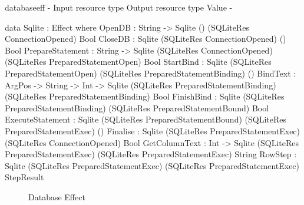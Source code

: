 \begin{SaveVerbatim}{databaseeff}
{-                   { Input resource type }                     { Output resource type }             { Value } -}

data Sqlite : Effect where
  OpenDB           : String -> 
                     Sqlite ()                                   (SQLiteRes ConnectionOpened)         Bool
  CloseDB          : Sqlite (SQLiteRes ConnectionOpened)         ()                                   Bool
  PrepareStatement : String -> 
                     Sqlite (SQLiteRes ConnectionOpened)         (SQLiteRes PreparedStatementOpen)    Bool
  StartBind        : Sqlite (SQLiteRes PreparedStatementOpen)    (SQLiteRes PreparedStatementBinding) ()
  BindText         : ArgPos -> String -> Int -> 
                     Sqlite (SQLiteRes PreparedStatementBinding) (SQLiteRes PreparedStatementBinding) Bool
  FinishBind       : Sqlite (SQLiteRes PreparedStatementBinding) (SQLiteRes PreparedStatementBound)   Bool
  ExecuteStatement : Sqlite (SQLiteRes PreparedStatementBound)   (SQLiteRes PreparedStatementExec)    ()
  Finalise         : Sqlite (SQLiteRes PreparedStatementExec)    (SQLiteRes ConnectionOpened)         Bool
  GetColumnText    : Int -> 
                     Sqlite (SQLiteRes PreparedStatementExec)    (SQLiteRes PreparedStatementExec)    String
  RowStep          : Sqlite (SQLiteRes PreparedStatementExec)    (SQLiteRes PreparedStatementExec)    StepResult
\end{SaveVerbatim}

\begin{figure*}[t]
\begin{center}
\end{center}
\caption{Database Effect}
\label{fig:dbeffect}
\end{figure*}

